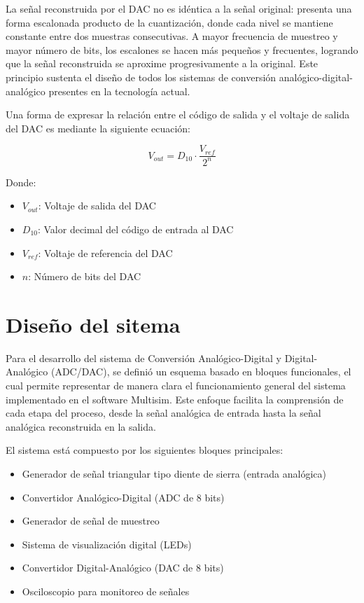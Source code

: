 \documentclass[12pt,letterpaper]{article}
\begin{document}
    La señal reconstruida por el DAC no es idéntica a la señal original: presenta una forma escalonada producto de la cuantización, donde cada nivel se mantiene constante entre dos muestras consecutivas. A mayor frecuencia de muestreo y mayor número de bits, los escalones se hacen más pequeños y frecuentes, logrando que la señal reconstruida se aproxime progresivamente a la original. Este principio sustenta el diseño de todos los sistemas de conversión analógico-digital-analógico presentes en la tecnología actual.

    Una forma de expresar la relación entre el código de salida y el voltaje de salida del DAC es mediante la siguiente ecuación:

    \begin{equation}
        V_{out} = D_{10} \cdot \frac{V_{ref}}{2^n}
        \label{Eq:Vout}
    \end{equation}

    Donde:

    \begin{itemize}
        \item $V_{out}$: Voltaje de salida del DAC
        \item $D_{10}$: Valor decimal del código de entrada al DAC
        \item $V_{ref}$: Voltaje de referencia del DAC
        \item $n$: Número de bits del DAC
    \end{itemize}

    \newpage
    \section{Diseño del sitema}

    Para el desarrollo del sistema de Conversión Analógico-Digital y Digital-Analógico (ADC/DAC), se definió un esquema basado en bloques funcionales, el cual permite representar de manera clara el funcionamiento general del sistema implementado en el software Multisim. Este enfoque facilita la comprensión de cada etapa del proceso, desde la señal analógica de entrada hasta la señal analógica reconstruida en la salida.

    El sistema está compuesto por los siguientes bloques principales:

    \begin{itemize}
        \item Generador de señal triangular tipo diente de sierra (entrada analógica)
        \item Convertidor Analógico-Digital (ADC de 8 bits)
        \item Generador de señal de muestreo 
        \item Sistema de visualización digital (LEDs)
        \item Convertidor Digital-Analógico (DAC de 8 bits)
        \item Osciloscopio para monitoreo de señales
    \end{itemize}
\end{document}
